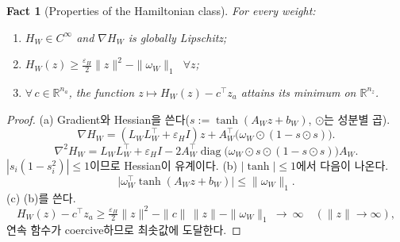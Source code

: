 \documentclass[11pt]{article}\usepackage[margin=1in]{geometry}\usepackage{amsmath,amssymb,amsthm,mathtools}\usepackage{graphicx}\graphicspath{{figures/}{../figures/}{figs/}{./}}\usepackage{enumitem}\usepackage{hyperref}\usepackage{cleveref}\usepackage{tikz}\usetikzlibrary{arrows.meta,positioning,calc,shapes.geometric}\usepackage{float}\usepackage{rotating}\usepackage[most]{tcolorbox}\usepackage{kotex}\usepackage{booktabs}\usepackage{longtable}\emergencystretch=1.6em\tolerance=2000 \crefname{assumption}{Assumption}{Assumptions}\Crefname{assumption}{Assumption}{Assumptions}\crefname{definition}{Definition}{Definitions}\Crefname{definition}{Definition}{Definitions}\crefname{proposition}{Proposition}{Propositions}\Crefname{proposition}{Proposition}{Propositions}\crefname{fact}{Fact}{Facts}\Crefname{fact}{Fact}{Facts} \newtheorem{assumption}{Assumption}\newtheorem{definition}{Definition}\newtheorem{lemma}{Lemma}\newtheorem{proposition}{Proposition}\newtheorem{theorem}{Theorem}\newtheorem{corollary}{Corollary}\newtheorem{fact}{Fact}\theoremstyle{remark}\newtheorem{remark}{Remark} \newcommand{\R}{\mathbb{R}}\newcommand{\xb}{\bar x}\newcommand{\Ab}{\bar A}\newcommand{\By}{\bar B_y}\newcommand{\U}{\mathcal U}\newcommand{\Z}{\mathcal Z}
\begin{document}
\begin{fact}[Properties of the Hamiltonian class]
\label{fact:hclass}
For every weight:
\begin{enumerate}[label=(\alph*)]
\item $H_W\in C^\infty$ and $\nabla H_W$ is globally Lipschitz;
\item $H_W(z)\ge\tfrac{\varepsilon_H}{2}\|z\|^2-\|\omega_W\|_1$ $\ \forall z$;
\item $\forall\,c\in\R^{n_a}$, the function $z\mapsto H_W(z)-c^\top z_a$ attains its minimum on $\R^{n_z}$.
\end{enumerate}
\end{fact}

\begin{proof}
(a) Gradient와 Hessian을 쓴다($s:=\tanh(A_Wz+b_W)$, $\odot$는 성분별 곱).
\[
\nabla H_W=(L_WL_W^\top+\varepsilon_HI)z+A_W^\top\big(\omega_W\odot(1-s\odot s)\big).
\]
\[
\nabla^2H_W=L_WL_W^\top+\varepsilon_HI-2A_W^\top\operatorname{diag}\big(\omega_W\odot s\odot(1-s\odot s)\big)A_W .
\]
$|s_i(1-s_i^2)|\le1$이므로 Hessian이 유계이다. (b) $|\tanh|\le1$에서 다음이 나온다.
\[
\big|\omega_W^\top\tanh(A_Wz+b_W)\big|\le\|\omega_W\|_1 .
\]
(c) (b)를 쓴다.
\[
H_W(z)-c^\top z_a\ge\tfrac{\varepsilon_H}{2}\|z\|^2-\|c\|\,\|z\|-\|\omega_W\|_1\ \longrightarrow\ \infty\quad(\|z\|\to\infty),
\]
연속 함수가 coercive하므로 최솟값에 도달한다.
\end{proof}
\end{document}
